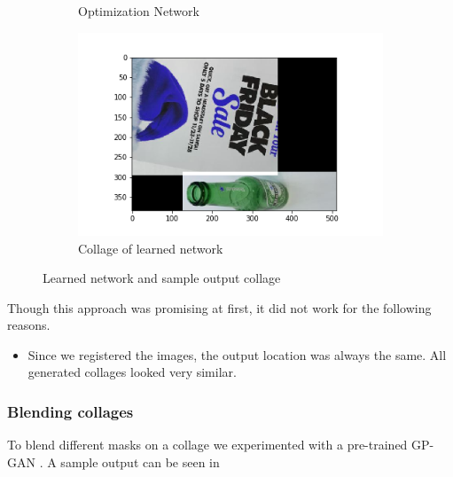 \documentclass{article}
\begin{document}
\begin{figure}
\begin{subfigure}{0.2\linewidth}
     \caption{Optimization Network}
  \end{subfigure}
  \begin{subfigure}{0.7\linewidth}
    \includegraphics[width=\linewidth]{data/images/section_4_Learned_Collage/collage_optimization_output.png}
    \caption{Collage of learned network}
  \end{subfigure}
    \label{fig:learned_collage_output}
    \caption{Learned network and sample output collage}
\end{figure}

Though this approach was promising at first, it did not work for the following reasons. 

\begin{itemize}
    \item Since we registered the images, the output location was always the same. All generated collages looked very similar. 
\end{itemize}




\subsubsection{Blending collages}
To blend different masks on a collage we experimented with a pre-trained GP-GAN \cite{wu2019gp}. A sample output can be seen in \pageref{fig:GAN_Blending}
\end{document}
